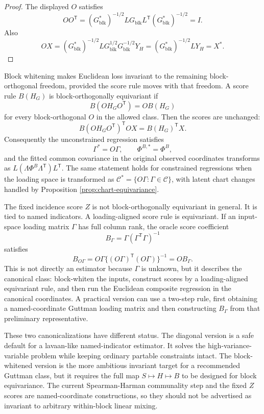 \documentclass[11pt]{article}
\newcommand{\T}{^{\mathsf T}}
\theoremstyle{plain}
\theoremstyle{remark}
\begin{document}
\begin{proof}
The displayed \(O\) satisfies
\[
  O O\T
  =
  (G_{\mathrm{blk}}^\ast)^{-1/2}
  LG_{\mathrm{blk}}L\T
  (G_{\mathrm{blk}}^\ast)^{-1/2}
  =
  I .
\]
Also
\[
  OX
  =
  (G_{\mathrm{blk}}^\ast)^{-1/2}LG_{\mathrm{blk}}^{1/2}
  G_{\mathrm{blk}}^{-1/2}Y_H
  =
  (G_{\mathrm{blk}}^\ast)^{-1/2}LY_H
  =
  X^\ast .
\]
\end{proof}

Block whitening makes Euclidean loss invariant to the remaining
block-orthogonal freedom, provided the score rule moves with that freedom. A
score rule \(B(H_G)\) is block-orthogonally equivariant if
\[
  B(O H_G O\T)=O B(H_G)
\]
for every block-orthogonal \(O\) in the allowed class. Then the scores are
unchanged:
\[
  B(O H_G O\T)\T OX=B(H_G)\T X .
\]
Consequently the unconstrained regression satisfies
\[
  \Gamma^\ast=O\Gamma,
  \qquad
  \Phi^{B,\ast}=\Phi^B,
\]
and the fitted common covariance in the original observed coordinates
transforms as \(L(\Lambda\Phi^B\Lambda\T)L\T\). The same statement holds for
constrained regressions when the loading space is transformed as
\(\mathcal C^\ast=\{O\Gamma:\Gamma\in\mathcal C\}\), with latent chart changes
handled by Proposition \ref{prop:chart-equivariance}.

The fixed incidence score \(Z\) is not block-orthogonally equivariant in
general. It is tied to named indicators. A loading-aligned score rule is
equivariant. If an input-space loading matrix \(\Gamma\) has full column rank,
the oracle score coefficient
\[
  B_\Gamma=\Gamma(\Gamma\T\Gamma)^{-1}
\]
satisfies
\[
  B_{O\Gamma}
  =
  O\Gamma\{(O\Gamma)\T(O\Gamma)\}^{-1}
  =
  OB_\Gamma .
\]
This is not directly an estimator because \(\Gamma\) is unknown, but it
describes the canonical class: block-whiten the inputs, construct scores by a
loading-aligned equivariant rule, and then run the Euclidean composite
regression in the canonical coordinates. A practical version can use a
two-step rule, first obtaining a named-coordinate Guttman loading matrix and
then constructing \(B_\Gamma\) from that preliminary representative.

These two canonicalizations have different status. The diagonal version is a
safe default for a lavaan-like named-indicator estimator. It solves the
high-variance-variable problem while keeping ordinary partable constraints
intact. The block-whitened version is the more ambitious invariant target for
a recommended Guttman class, but it requires the full map \(S\mapsto H\mapsto
B\) to be designed for block equivariance. The current Spearman-Harman
communality step and the fixed \(Z\) scores are named-coordinate constructions,
so they should not be advertised as invariant to arbitrary within-block
linear mixing.
\end{document}
